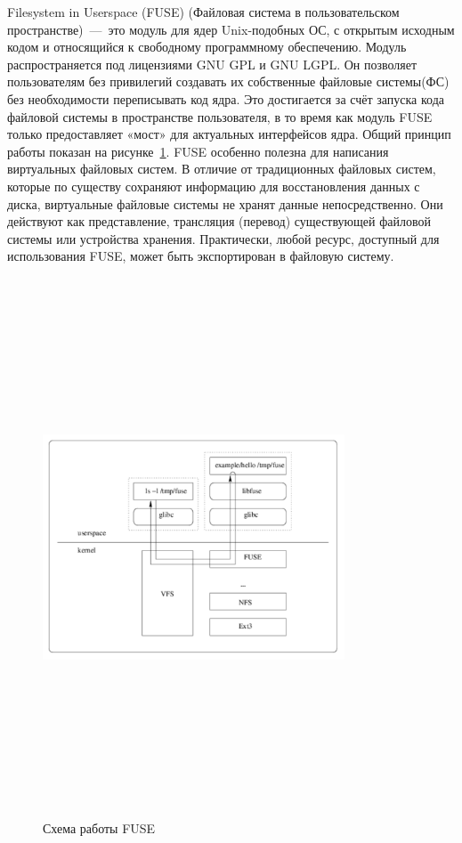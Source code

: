 \documentclass[utf8,usehyperref,12pt]{G7-32}
\begin{document}
Filesystem in Userspace (FUSE) (Файловая система в пользовательском пространстве)~—~это модуль для ядер Unix-подобных ОС, с открытым исходным кодом и относящийся к свободному программному обеспечению. Модуль распространяется под лицензиями GNU GPL и GNU LGPL. Он позволяет пользователям без привилегий создавать их собственные файловые системы(ФС) без необходимости переписывать код ядра. Это достигается за счёт запуска кода файловой системы в пространстве пользователя, в то время как модуль FUSE только предоставляет «мост» для актуальных интерфейсов ядра\cite{fuse_wiki}. Общий принцип работы показан на рисунке~\ref{fig:fuse_structure}. FUSE особенно полезна для написания виртуальных файловых систем. В отличие от традиционных файловых систем, которые по существу сохраняют информацию для восстановления данных с диска, виртуальные файловые системы не хранят данные непосредственно. Они действуют как представление, трансляция (перевод) существующей файловой системы или устройства хранения. Практически, любой ресурс, доступный для использования FUSE, может быть экспортирован в файловую систему.

\begin{figure}[hb!]
   \centering%
   \includegraphics[height=160mm, width=0.8\textwidth, clip, keepaspectratio]{pictures/fuse_structure}
   \caption{Схема работы FUSE}\label{fig:fuse_structure}
 \end{figure}
\end{document}

